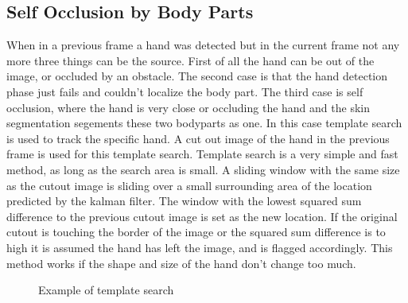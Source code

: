 \subsection*{Self Occlusion by Body Parts}
When in a previous frame a hand was detected but in the current frame not any more three things can be the source. First of all the hand can be out of the image, or occluded by an obstacle. The second case is that the hand detection phase just fails and couldn't localize the body part. The third case is self occlusion, where the hand is very close or occluding the hand and the skin segmentation segements these two bodyparts as one. In this case template search is used to track the specific hand. A cut out image of the hand in the previous frame is used for this template search. Template search is a very simple and fast method, as long as the search area is small. A sliding window  with the same size as the cutout image is sliding over a small surrounding area of the location predicted by the kalman filter. The window with the lowest squared sum difference to the previous cutout image is set as the new location. If the original cutout is touching the border of the image or the squared sum difference is to high it is assumed the hand has left the image, and is flagged accordingly. This method works if the shape and size of the hand don't change too much.

\begin{figure}[htbp]
\begin{center}
\hspace{0.03\linewidth}
\end{center}
\caption{Example of template search}
\label{fig:templatesearch}
\end{figure}

